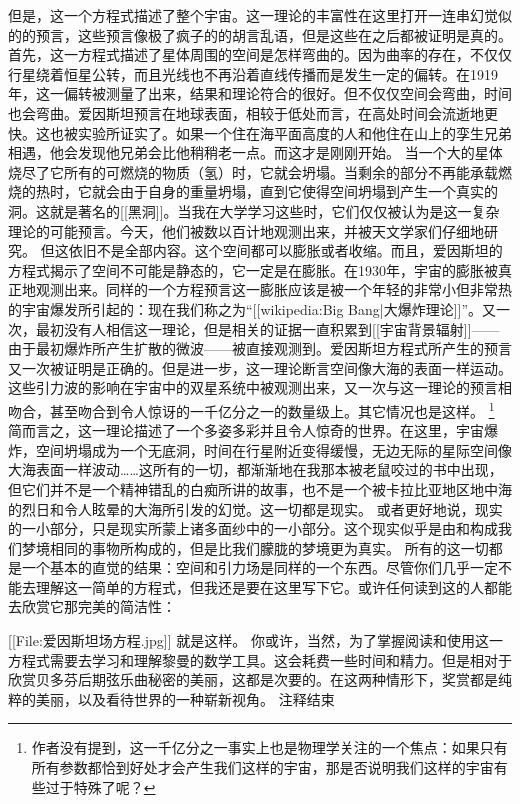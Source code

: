     但是，这一个方程式描述了整个宇宙。这一理论的丰富性在这里打开一连串幻觉似的的预言，这些预言像极了疯子的的胡言乱语，但是这些在之后都被证明是真的。
    首先，这一方程式描述了星体周围的空间是怎样弯曲的。因为曲率的存在，不仅仅行星绕着恒星公转，而且光线也不再沿着直线传播而是发生一定的偏转。在1919年，这一偏转被测量了出来，结果和理论符合的很好。但不仅仅空间会弯曲，时间也会弯曲。爱因斯坦预言在地球表面，相较于低处而言，在高处时间会流逝地更快。这也被实验所证实了。如果一个住在海平面高度的人和他住在山上的孪生兄弟相遇，他会发现他兄弟会比他稍稍老一点。而这才是刚刚开始。
    当一个大的星体烧尽了它所有的可燃烧的物质（氢）时，它就会坍塌。当剩余的部分不再能承载燃烧的热时，它就会由于自身的重量坍塌，直到它使得空间坍塌到产生一个真实的洞。这就是著名的[[黑洞]]。当我在大学学习这些时，它们仅仅被认为是这一复杂理论的可能预言。今天，他们被数以百计地观测出来，并被天文学家们仔细地研究。
    但这依旧不是全部内容。这个空间都可以膨胀或者收缩。而且，爱因斯坦的方程式揭示了空间不可能是静态的，它一定是在膨胀。在1930年，宇宙的膨胀被真正地观测出来。同样的一个方程预言这一膨胀应该是被一个年轻的非常小但非常热的宇宙爆发所引起的：现在我们称之为“[[wikipedia:Big Bang|大爆炸理论]]”。又一次，最初没有人相信这一理论，但是相关的证据一直积累到[[宇宙背景辐射]]——由于最初爆炸所产生扩散的微波——被直接观测到。爱因斯坦方程式所产生的预言又一次被证明是正确的。但是进一步，这一理论断言空间像大海的表面一样运动。这些引力波的影响在宇宙中的双星系统中被观测出来，又一次与这一理论的预言相吻合，甚至吻合到令人惊讶的一千亿分之一的数量级上。其它情况也是这样。
\footnote[5]
{
作者没有提到，这一千亿分之一事实上也是物理学关注的一个焦点：如果只有所有参数都恰到好处才会产生我们这样的宇宙，那是否说明我们这样的宇宙有些过于特殊了呢？
}
    简而言之，这一理论描述了一个多姿多彩并且令人惊奇的世界。在这里，宇宙爆炸，空间坍塌成为一个无底洞，时间在行星附近变得缓慢，无边无际的星际空间像大海表面一样波动……这所有的一切，都渐渐地在我那本被老鼠咬过的书中出现，但它们并不是一个精神错乱的白痴所讲的故事，也不是一个被卡拉比亚地区地中海的烈日和令人眩晕的大海所引发的幻觉。这一切都是现实。
    或者更好地说，现实的一小部分，只是现实所蒙上诸多面纱中的一小部分。这个现实似乎是由和构成我们梦境相同的事物所构成的，但是比我们朦胧的梦境更为真实。
    所有的这一切都是一个基本的直觉的结果：空间和引力场是同样的一个东西。尽管你们几乎一定不能去理解这一简单的方程式，但我还是要在这里写下它。或许任何读到这的人都能去欣赏它那完美的简洁性：
    
                            [[File:爱因斯坦场方程.jpg]]
    就是这样。
    你或许，当然，为了掌握阅读和使用这一方程式需要去学习和理解黎曼的数学工具。这会耗费一些时间和精力。但是相对于欣赏贝多芬后期弦乐曲秘密的美丽，这都是次要的。在这两种情形下，奖赏都是纯粹的美丽，以及看待世界的一种崭新视角。
{{注释结束}}


